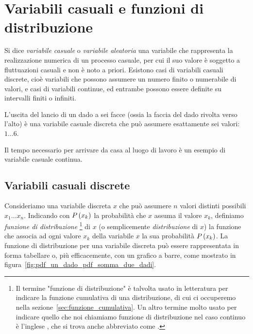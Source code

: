 \section{Variabili casuali e funzioni di distribuzione}

Si dice \emph{variabile casuale} o \emph{variabile aleatoria} una variabile
che rappresenta la realizzazione numerica di un processo casuale, per cui
il suo valore è soggetto a fluttuazioni casuali e non è noto a priori.
Esistono casi di variabili casuali discrete, cioè variabili che possono
assumere un numero finito o numerabile di valori, e casi di variabili
continue, ed entrambe possono essere definite su intervalli finiti o infiniti.

\begin{examplebox}
  \begin{example}
    L'uscita del lancio di un dado a sei facce (ossia la faccia del dado
    rivolta verso l'alto) è una variabile casuale discreta che può assumere
    esattamente sei valori: $1 \ldots 6$.
  \end{example}

  \begin{example}
    Il tempo necessario per arrivare da casa al luogo di lavoro è un esempio
    di variabile casuale continua.
  \end{example}
\end{examplebox}


\subsection{Variabili casuali discrete}

Consideriamo una variabile discreta $x$ che può assumere $n$ valori distinti
possibili $x_1 \ldots x_n$. Indicando con $\displaystyle P\left(x_k\right)$ la probabilità che
$x$ assuma il valore $x_k$, definiamo \emph{funzione di distribuzione}%
\footnote{Il termine "funzione di distribuzione" è talvolta usato in
  letteratura per indicare la funzione cumulativa di una distribuzione, di cui
  ci occuperemo nella sezione~\ref{sec:funzione_cumulativa}. Un altro termine
  molto usato per indicare quello che noi chiamiamo funzione di distribuzione
  nel caso continuo è l'inglese ,
  che si trova anche abbreviato come .}
di $x$ (o semplicemente \emph{distribuzione} di $x$) la funzione che associa ad
ogni valore $x_k$ della variabile $x$ la sua probabilità $\displaystyle P\left(x_k\right)$.
La funzione di distribuzione per una variabile discreta può essere
rappresentata in forma tabellare o, più efficacemente, con un grafico a barre,
come mostrato in figura~\ref{fig:pdf_un_dado_pdf_somma_due_dadi}.

